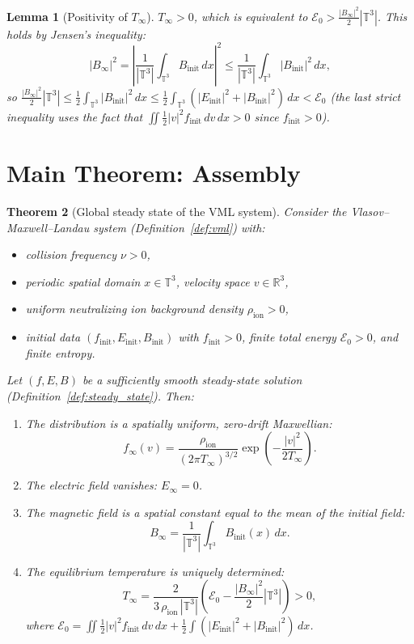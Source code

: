 \documentclass[11pt]{article}
\newcommand{\R}{\mathbb{R}}
\newcommand{\T}{\mathbb{T}}
\newtheorem{theorem}{Theorem}
\newtheorem{lemma}[theorem]{Lemma}
\begin{document}
\begin{lemma}[Positivity of $T_\infty$]
\label{lem:T_positive}
$T_\infty > 0$, which is equivalent to $\mathcal{E}_0 > \frac{|B_\infty|^2}{2}|\T^3|$. This holds by Jensen's inequality:
\[
|B_\infty|^2 = \left|\frac{1}{|\T^3|}\int_{\T^3} B_{\mathrm{init}} \, dx\right|^2 \leq \frac{1}{|\T^3|} \int_{\T^3} |B_{\mathrm{init}}|^2 \, dx,
\]
so $\frac{|B_\infty|^2}{2}|\T^3| \leq \frac{1}{2}\int_{\T^3}|B_{\mathrm{init}}|^2 \, dx \leq \frac{1}{2}\int_{\T^3}(|E_{\mathrm{init}}|^2 + |B_{\mathrm{init}}|^2) \, dx < \mathcal{E}_0$ (the last strict inequality uses the fact that $\iint \frac{1}{2}|v|^2 f_{\mathrm{init}} \, dv \, dx > 0$ since $f_{\mathrm{init}} > 0$).
\end{lemma}

\section{Main Theorem: Assembly}
\label{sec:main}

\begin{theorem}[Global steady state of the VML system]
\label{thm:main}
Consider the Vlasov--Maxwell--Landau system (Definition~\ref{def:vml}) with:
\begin{itemize}
\item collision frequency $\nu > 0$,
\item periodic spatial domain $x \in \T^3$, velocity space $v \in \R^3$,
\item uniform neutralizing ion background density $\rho_{\mathrm{ion}} > 0$,
\item initial data $(f_{\mathrm{init}}, E_{\mathrm{init}}, B_{\mathrm{init}})$ with $f_{\mathrm{init}} > 0$, finite total energy $\mathcal{E}_0 > 0$, and finite entropy.
\end{itemize}
Let $(f, E, B)$ be a sufficiently smooth steady-state solution (Definition~\ref{def:steady_state}). Then:
\begin{enumerate}[label=(\roman*)]
\item The distribution is a spatially uniform, zero-drift Maxwellian:
\[
f_\infty(v) = \frac{\rho_{\mathrm{ion}}}{(2\pi T_\infty)^{3/2}} \exp\!\left(-\frac{|v|^2}{2T_\infty}\right).
\]

\item The electric field vanishes: $E_\infty = 0$.

\item The magnetic field is a spatial constant equal to the mean of the initial field:
\[
B_\infty = \frac{1}{|\T^3|}\int_{\T^3} B_{\mathrm{init}}(x) \, dx.
\]

\item The equilibrium temperature is uniquely determined:
\[
T_\infty = \frac{2}{3\, \rho_{\mathrm{ion}} \, |\T^3|} \left(\mathcal{E}_0 - \frac{|B_\infty|^2}{2} |\T^3|\right) > 0,
\]
where $\mathcal{E}_0 = \iint \frac{1}{2}|v|^2 f_{\mathrm{init}} \, dv \, dx + \frac{1}{2}\int (|E_{\mathrm{init}}|^2 + |B_{\mathrm{init}}|^2) \, dx$.
\end{enumerate}
\end{theorem}
\end{document}

